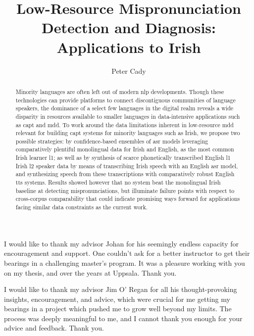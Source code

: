 \documentclass[thesis]{cluu}
\begin{document}
\title{Low-Resource Mispronunciation Detection and Diagnosis: Applications to Irish} %
\author{Peter Cady}

\maketitle

\begin{abstract}
    Minority languages are often left out of modern \acrshort{nlp} developments. Though these technologies can provide platforms to connect discontiguous communities of language speakers, the dominance of a select few languages in the digital realm reveals a wide disparity in resources available to smaller languages in data-intensive applications such as \gls{capt} and \gls{mdd}.
    To work around the data limitations inherent in low-resource \gls{mdd} relevant for building \gls{capt} systems for minority languages such as Irish, we propose two possible strategies: by confidence-based ensembles of \acrshort{asr} models leveraging comparatively plentiful monolingual data for Irish and English, as the most common Irish learner \gls{l1}; as well as by synthesis of scarce phonetically transcribed English \gls{l1} Irish \gls{l2} speaker data by means of transcribing Irish speech with an English \acrshort{asr} model, and synthesizing speech from these transcriptions with comparatively robust English \acrshort{tts} systems.
    Results showed however that no system beat the monolingual Irish baseline at detecting mispronunciations, but illuminate failure points with respect to cross-corpus comparability that could indicate promising ways forward for applications facing similar data constraints as the current work.
\end{abstract}

\tableofcontents

I would like to thank my advisor Johan for his seemingly endless capacity for encouragement and support. One couldn't ask for a better instructor to get their bearings in a challenging master's program. It was a pleasure working with you on my thesis, and over the years at Uppsala. Thank you.
\bigskip

I would like to thank my advisor Jim O' Regan for all his thought-provoking insights, encouragement, and advice, which were crucial for me getting my bearings in a project which pushed me to grow well beyond my limits. The process was deeply meaningful to me, and I cannot thank you enough for your advice and feedback. Thank you.
\bigskip
\end{document}
